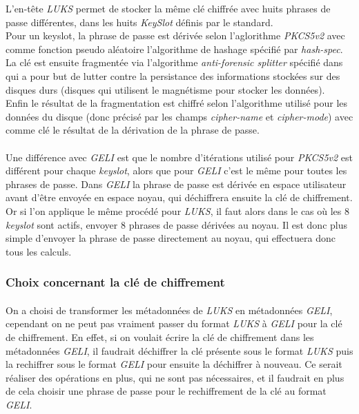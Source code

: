 L'en-tête {\em LUKS} permet de stocker la même clé chiffrée avec huits phrases
de passe différentes, dans les huits {\em KeySlot} définis par le standard.
\\
Pour un keyslot, la phrase de passe est dérivée selon l'aglorithme {\em PKCS5v2}
avec comme fonction pseudo aléatoire l'algorithme de hashage spécifié par 
{\em hash-spec}. La clé est ensuite fragmentée via l'algorithme 
{\em anti-forensic splitter} spécifié dans \cite{AFsplitting} qui a pour but de
lutter contre la persistance des informations stockées sur des disques durs
(disques qui utilisent le magnétisme pour stocker les données).
\\
Enfin le résultat de la fragmentation est chiffré selon l'algorithme utilisé 
pour les données du disque (donc précisé par les champs {\em cipher-name} et 
{\em cipher-mode}) avec comme clé le résultat de la dérivation de la phrase de
passe.

\paragraph{}
Une différence avec {\em GELI} est que le nombre d'itérations utilisé pour 
{\em PKCS5v2} est différent pour chaque {\em keyslot}, alors que pour {\em GELI}
c'est le même pour toutes les phrases de passe.
Dans {\em GELI} la phrase de passe est dérivée en espace utilisateur avant
d'être envoyée en espace noyau, qui déchiffrera ensuite la clé de chiffrement.
Or si l'on applique le même procédé pour {\em LUKS}, il faut alors dans le cas
où les 8 {\em keyslot} sont actifs, envoyer 8 phrases de passe dérivées au
noyau. Il est donc plus simple d'envoyer la phrase de passe directement au
noyau, qui effectuera donc tous les calculs.

\subsubsection{Choix concernant la clé de chiffrement}
\paragraph{}
On a choisi de transformer les métadonnées de {\em LUKS} en métadonnées 
{\em GELI}, cependant on ne peut pas vraiment passer du format {\em LUKS} à 
{\em GELI} pour la clé de chiffrement. En effet, si on voulait écrire la clé 
de chiffrement dans les métadonnées {\em GELI}, il faudrait déchiffrer la clé 
présente sous le format {\em LUKS} puis la rechiffrer sous le format {\em GELI}
pour ensuite la déchiffrer à nouveau. Ce serait réaliser des opérations en plus,
qui ne sont pas nécessaires, et il faudrait en plus de cela choisir une phrase
de passe pour le rechiffrement de la clé au format {\em GELI}. 


